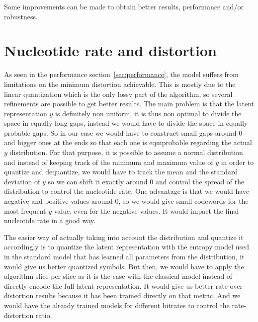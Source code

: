 

Some improvements can be made to obtain better results, performance and/or robustness. 

\section{Nucleotide rate and distortion}

As seen in the performance section~\ref{sec:performance}, the model suffers from limitations on the minimum distortion achievable. This is mostly due to the linear quantization which is the only lossy part of the algorithm, so several refinements are possible to get better results. The main problem is that the latent representation $y$ is definitely non uniform, it is thus non optimal to divide the space in equally long gaps, instead we would have to divide the space in equally probable gaps. So in our case we would have to construct small gaps around $0$ and bigger ones at the ends so that each one is equiprobable regarding the actual $y$ distribution. 
For that purpose, it is possible to assume a normal distribution and instead of keeping track of the minimum and maximum value of $y$ in order to quantize and dequantize, we would have to track the mean and the standard deviation of $y$ so we can shift it exactly around $0$ and control the spread of the distribution to control the nucleotide rate. One advantage is that we would have negative and positive values around $0$, so we would give small codewords for the most frequent $y$ value, even for the negative values. It would impact the final nucleotide rate in a good way.

The easier way of actually taking into account the distribution and quantize it accordingly is to quantize the latent representation with the entropy model used in the standard model that has learned all parameters from the distribution, it would give us better quantized symbols. But then, we would have to apply the algorithm slice per slice as it is the case with the classical model instead of directly encode the full latent representation. It would give us better rate over distortion results because it has been trained directly on that metric. And we would have the already trained models for different bitrates to control the rate-distortion ratio.

